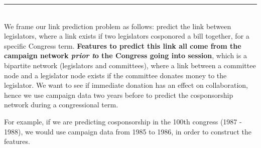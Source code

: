 \documentclass[a0]{a0poster}
\def\Head#1{\noindent{\LARGE\color{bluegray} #1}\bigskip}
\begin{document}
\begin{textblock}{7.0}
\medskip
\hrule\medskip
\Head{Link Prediction}\\
We frame our link prediction problem as follows: predict the link between legislators, where a link exists if two legislators cosponored a bill together, for a specific Congress term.  \textbf{Features to predict this link all come from the campaign network \textit{prior t}o the Congress going into session}, which is a bipartite network (legislators and committees), where a link between a committee node and a legislator node exists if the committee donates money to the legislator.  We want to see if immediate donation has an effect on collaboration, hence we use campaign data two years before to predict the cosponsorship network during a congressional term. 

For example, if we are predicting cosponsorship in the 100th congress (1987 - 1988), we would use campaign data from 1985 to 1986, in order to construct the features.

\end{textblock}
\end{document}
